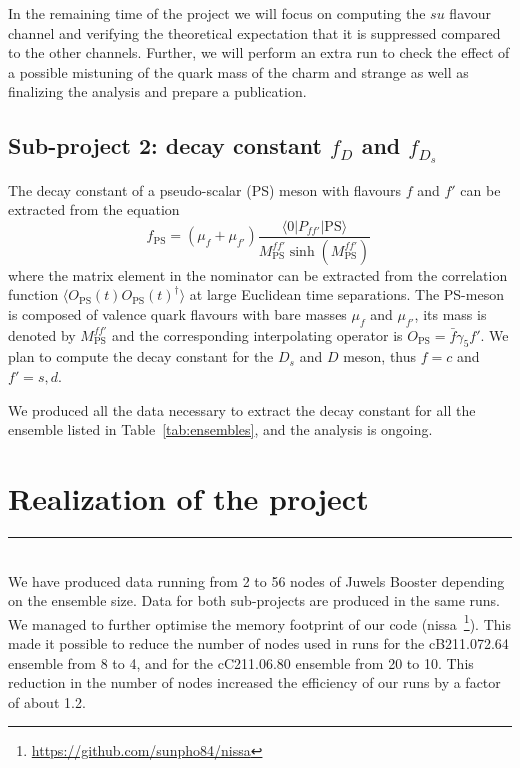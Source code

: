 \documentclass [a4paper, 11pt]{article}
\begin{document}
In the remaining time of the project we will focus on computing the
$su$ flavour channel and verifying the
theoretical expectation that it is suppressed compared to the other
channels. Further, we will perform an extra run to check the effect of a 
possible mistuning of the quark mass of the charm and strange as well
as finalizing the analysis and prepare a publication. 


\subsection{Sub-project 2: decay constant $f_D$ and $f_{D_s}$}

The decay constant of a pseudo-scalar (PS) meson with flavours $f$ and
$f'$ can be extracted from the equation
\begin{equation}
  f_\mathrm{PS}=(\mu_f+\mu_{f'})\frac{\langle 0| P_{ff'}|
    \mathrm{PS}\rangle}{M_\mathrm{PS}^{ff'}\sinh(M_\mathrm{PS}^{ff'})}\,
\end{equation}
where the matrix element in the nominator can be extracted from the
correlation function $\langle O_\mathrm{PS}(t)O_\mathrm{PS}(t)^\dagger
\rangle$ at large Euclidean time separations. The PS-meson is composed of
valence quark flavours with bare masses $\mu_f$ and $\mu_{f'}$,
its mass is denoted by $M_\mathrm{PS}^{ff'}$ and the corresponding interpolating
operator is $O_\mathrm{PS}=\bar f \gamma_5 f' $. We plan to compute the
decay constant for the $D_s$ and $D$ meson, thus $f=c$ and $f'=s,d$.

We produced all the data necessary to extract the decay constant for
all the ensemble listed in Table~\ref{tab:ensembles}, and the analysis
is ongoing.



\section{Realization of the project}
\rule{\textwidth}{0.4pt}\\


We have produced data running from 2 to 56 nodes of Juwels Booster
depending on the ensemble size. Data for both sub-projects are
produced in the same runs.
We managed to further optimise the memory footprint of our code
(nissa~\footnote{\url{https://github.com/sunpho84/nissa}}). This made
it possible to reduce the number of nodes used in runs for the
cB211.072.64 ensemble from 8 to 4, and for the cC211.06.80 ensemble
from 20 to 10. This reduction in the number of nodes increased the
efficiency of our runs by a factor of about 1.2.
\end{document}
